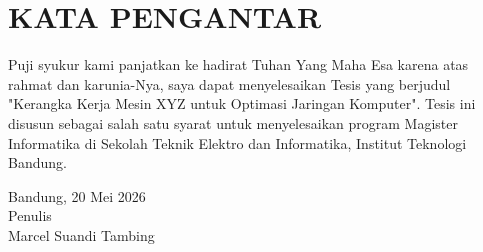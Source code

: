 \chapter*{KATA PENGANTAR}

Puji syukur kami panjatkan ke hadirat Tuhan Yang Maha Esa karena atas rahmat dan karunia-Nya, saya dapat menyelesaikan Tesis yang berjudul "Kerangka Kerja Mesin XYZ untuk Optimasi Jaringan Komputer". Tesis ini disusun sebagai salah satu syarat untuk menyelesaikan program Magister Informatika di Sekolah Teknik Elektro dan Informatika, Institut Teknologi Bandung.
\begin{flushright}
    Bandung, 20 Mei 2026\\
    
    Penulis \\
    \vspace{1cm}
    Marcel Suandi Tambing \\
\end{flushright}
